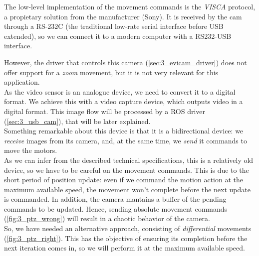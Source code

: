 		The low-level implementation of the movement commands is the \emph{VISCA} protocol, a propietary solution from the manufacturer (Sony). It is received by the cam through a RS-232C (the traditional low-rate serial interface before USB extended), so we can connect it to a modern computer with a RS232-USB interface.

		However, the driver that controls this camera (\ref{sec:3_evicam_driver}) does not offer support for a \emph{zoom} movement, but it is not very relevant for this application.\\

		As the video sensor is an analogue device, we need to convert it to a digital format. We achieve this with a video capture device, which outputs video in a digital format. This image flow will be processed by a ROS driver (\autoref{sec:3_usb_cam}), that will be later explained.\\

		Something remarkable about this device is that it is a bidirectional device: we \textit{receive} images from its camera, and, at the same time, we \textit{send} it commands to move the motors.\\
		
		As we can infer from the described technical specifications, this is a relatively old device, so we have to be careful on the movement commands. This is due to the short period of position update: even if we command the motion action at the maximum available speed, the movement won't complete before the next update is commanded. In addition, the camera mantains a buffer of the pending commands to be updated. Hence, sending absolute movement commands (\autoref{fig:3_ptz_wrong}) will result in a chaotic behavior of the camera.\\
		
		So, we have needed an alternative approach, consisting of \emph{differential} movements (\autoref{fig:3_ptz_right}). This has the objective of ensuring its completion before the next iteration comes in, so we will perform it at the maximum available speed.

